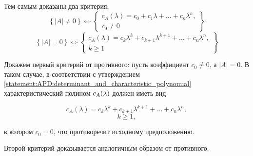 \begin{corollary} \label{corollary:APD:determinant_and_characteristic_polynomial}
	Тем самым доказаны два критерия:
		$$
			\left \{
				\left | A \right | \neq 0
			\right \}
			\Leftrightarrow
			\left \{
				\begin{array}{c}
					c_A(\lambda) = c_0 + c_1 \lambda + \dots + c_n \lambda^n,\\
					c_0 \neq 0
				\end{array}
			\right \}
		$$
		$$
			\left \{
				\left | A \right | = 0
			\right \}
			\Leftrightarrow
			\left \{
				\begin{array}{c}
					c_A(\lambda) = c_k \lambda^k + c_{k+1} \lambda^{k+1} + \dots + c_n \lambda^n,\\
					k \ge 1
				\end{array}
			\right \}
		$$

	\proof

	Докажем первый критерий от противного: пусть коэффициент $c_0 \neq 0$, а $\left | A \right | = 0$. В таком случае, в соответствии
	с утверждением \ref{statement:APD:determinant_and_characteristic_polynomial} характеристический полином $c_A (\lambda)$ должен иметь
	вид

		$$ c_A(\lambda) = c_k \lambda^k + c_{k+1} \lambda^{k+1} + \dots + c_n \lambda^n, $$
		$$ k \ge 1, $$

	в котором $c_0 = 0$, что противоречит исходному предположению.

	Второй критерий доказывается аналогичным образом от противного.
\end{corollary}

